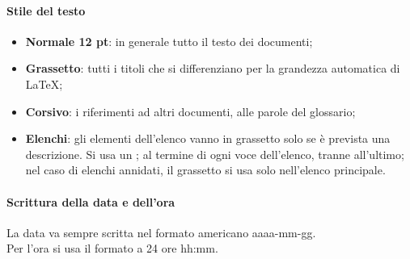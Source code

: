 \paragraph{Stile del testo}
\begin{itemize}
        \item \textbf{Normale 12 pt}: in generale tutto il testo dei documenti;
        \item \textbf{Grassetto}: tutti i titoli che si differenziano per la grandezza automatica di \LaTeX ;
        \item \textbf{Corsivo}: i riferimenti ad altri documenti, alle parole del glossario;
        \item \textbf{Elenchi}: gli elementi dell'elenco vanno in grassetto solo se è prevista una descrizione. 
                                Si usa un ; al termine di ogni voce dell'elenco, tranne all'ultimo; \\
                                nel caso di elenchi annidati, il grassetto si usa solo nell'elenco principale.
\end{itemize}

\paragraph{Scrittura della data e dell'ora} \hfill \break
La data va sempre scritta nel formato americano aaaa-mm-gg. \\
Per l'ora si usa il formato a 24 ore hh:mm.

